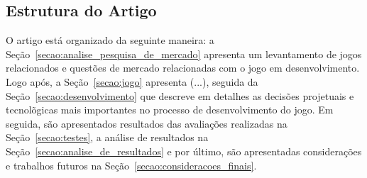 \subsection{Estrutura do Artigo}
\label{secao:estrutura_do_artigo}
    \item O artigo está organizado da seguinte maneira: a Seção~\ref{secao:analise_pesquisa_de_mercado} apresenta um levantamento de jogos relacionados e questões de mercado relacionadas com o jogo em desenvolvimento. Logo após, a Seção~\ref{secao:jogo} apresenta (...), seguida da Seção~\ref{secao:desenvolvimento} que descreve em detalhes as decisões projetuais e tecnolõgicas mais importantes no processo de desenvolvimento do jogo. Em seguida, são apresentados resultados das avaliações realizadas na Seção~\ref{secao:testes}, a análise de resultados na Seção~\ref{secao:analise_de_resultados} e por último, são apresentadas considerações e trabalhos futuros na Seção~\ref{secao:consideracoes_finais}.
